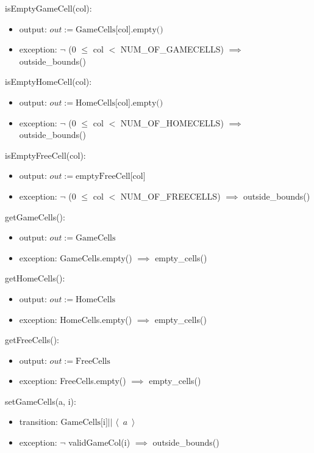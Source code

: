 \documentclass[12pt]{article}
\begin{document}
\noindent isEmptyGameCell(col):
\begin{itemize}
\item output: $out := \mbox{GameCells[col].empty()}$
\item exception: $\lnot$ (0 $\leq$ col $<$ NUM\_OF\_GAMECELLS) $\implies$ outside\_bounds()
\end{itemize}

\noindent isEmptyHomeCell(col):
\begin{itemize}
\item output: $out := \mbox{HomeCells[col].empty()}$
\item exception: $\lnot$ (0 $\leq$ col $<$ NUM\_OF\_HOMECELLS) $\implies$ outside\_bounds()
\end{itemize}

\noindent isEmptyFreeCell(col):
\begin{itemize}
\item output: $out := \mbox{emptyFreeCell[col]}$
\item exception: $\lnot$ (0 $\leq$ col $<$ NUM\_OF\_FREECELLS) $\implies$ outside\_bounds()
\end{itemize}

\noindent getGameCells():
\begin{itemize}
\item output: $out := \mbox{GameCells}$
\item exception:  GameCells.empty() $\implies$ empty\_cells()
\end{itemize}

\noindent getHomeCells():
\begin{itemize}
\item output: $out := \mbox{HomeCells}$
\item exception:  HomeCells.empty() $\implies$ empty\_cells()
\end{itemize}

\noindent getFreeCells():
\begin{itemize}
\item output: $out := \mbox{FreeCells}$
\item exception:  FreeCells.empty() $\implies$ empty\_cells()
\end{itemize}

\noindent setGameCells(a, i):
\begin{itemize}
\item transition: $\mbox{GameCells[i]} || \,\, \langle\,\,\,  a \,\,\,  \rangle$
\item exception: $\lnot$ validGameCol(i) $\implies$ outside\_bounds()
\end{itemize}
\end{document}
